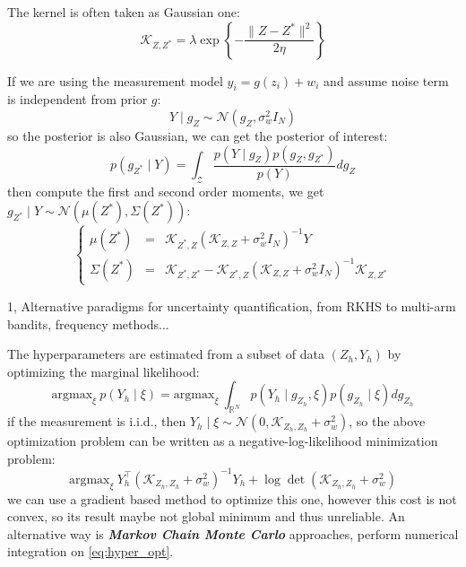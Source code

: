 \documentclass[10pt]{elegantbook}
\newcommand{\mydefination}[1]{\textbf{\textit{\textcolor{structurecolor}{#1}}}}
\begin{document}
The kernel is often taken as Gaussian one:
\[
\mathscr{K}_{Z, Z^*} = \lambda \exp \left \{ -\frac{\| Z - Z^* \|^2}{2 \eta} \right \}
\]

If we are using the measurement model $y_i = g(z_i) + w_i$ and assume noise term is independent from prior $g$:
\[
Y \mid g_Z \sim \mathcal N (g_Z, \sigma_w^2 I_N)
\]
so the posterior is also Gaussian, we can get the posterior of interest:
\[
p(g_{Z^*} \mid Y) = \int_{\mathcal Z} \frac{p(Y \mid g_Z)p(g_Z, g_{Z^*})}{p(Y)} dg_Z
\]
then compute the first and second order moments, we get $g_{Z^*} \mid Y \sim \mathcal N (\mu(Z^*), \Sigma(Z^*))$:
\begin{equation} \label{eq:gp_mean_cov}
\left \{
\begin{array}{lll}
    \mu(Z^*) &=& \mathscr{K}_{Z^*, Z} (\mathscr{K}_{Z, Z} + \sigma_w^2 I_N)^{-1} Y \\
    \Sigma(Z^*) &=& \mathscr{K}_{Z^*, Z^*} - \mathscr{K}_{Z^*, Z} (\mathscr{K}_{Z, Z} + \sigma_w^2 I_N)^{-1} \mathscr{K}_{Z, Z^*}
\end{array}    
\right .
\end{equation}

\begin{remark}
    1, Alternative paradigms for uncertainty quantification, from RKHS to multi-arm bandits, frequency methods...
\end{remark}

The hyperparameters are estimated from a subset of data $(Z_h, Y_h)$ by optimizing the marginal likelihood:
\begin{equation} \label{eq:hyper_opt}
\text{argmax}_{\xi} ~ p(Y_h \mid \xi) = \text{argmax}_{\xi} ~ \int_{\mathbb R^N} p(Y_h \mid g_{Z_h}, \xi)p(g_{Z_h} \mid \xi)dg_{Z_h}
\end{equation}
if the measurement is i.i.d., then $Y_h \mid \xi \sim \mathcal N(0, \mathscr{K}_{Z_h, Z_h} + \sigma_w^2)$, so the above optimization
problem can be written as a negative-log-likelihood minimization problem:
\begin{equation} \label{eq:hyper_nll_opt}
\text{argmax}_{\xi} ~ Y_h^{\top}(\mathscr{K}_{Z_h, Z_h} + \sigma_w^2)^{-1}Y_h + \log \det(\mathscr{K}_{Z_h, Z_h} + \sigma_w^2)
\end{equation}
we can use a gradient based method to optimize this one, however this cost is not convex, so its result maybe not global minimum and 
thus unreliable. An alternative way is \mydefination{Markov Chain Monte Carlo} approaches, perform numerical integration on \ref{eq:hyper_opt}.
\end{document}
